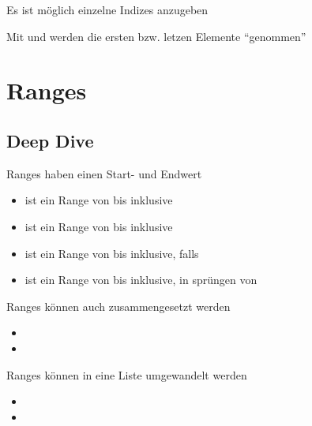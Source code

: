 \begin{frame}
    \slidehead
    Es ist möglich einzelne Indizes anzugeben
\end{frame}

\begin{frame}
    \slidehead
    Mit  und  werden die ersten bzw. letzen  Elemente \enquote{genommen}
\end{frame}

\livecoding

\section{Ranges}
\subsection{Deep Dive}
\begin{frame}
    \slidehead
    Ranges haben einen Start- und Endwert
    \begin{itemize}
        \item<1->  ist ein Range von  bis  inklusive
        \item<2->  ist ein Range von  bis  inklusive
        \item<3->  ist ein Range von  bis  inklusive, falls 
        \item<4->  ist ein Range von  bis  inklusive, in sprüngen von 
    \end{itemize}
    Ranges können auch zusammengesetzt werden
    \begin{itemize}
        \item<6-> 
        \item<7-> 
    \end{itemize}
    Ranges können in eine Liste umgewandelt werden
    \begin{itemize}
        \item<9-> 
        \item<9-> 
    \end{itemize}
\end{frame}

